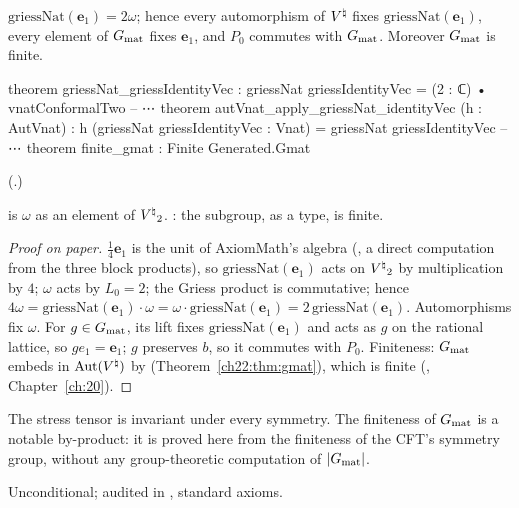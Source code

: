 \begin{theorem}\label{ch22:thm:omega}
$\mathrm{griessNat}(\mathbf{e}_1)=2\omega$; hence every automorphism of ${V^{\natural}}$ fixes $\mathrm{griessNat}(\mathbf{e}_1)$, every element of
$G_{\mathrm{mat}}$ fixes $\mathbf{e}_1$, and $P_0$ commutes with $G_{\mathrm{mat}}$.  Moreover $G_{\mathrm{mat}}$ is finite.
\end{theorem}
\begin{leancode}
theorem griessNat_griessIdentityVec :
    griessNat griessIdentityVec = (2 : ℂ) • vnatConformalTwo
-- ⋯
theorem autVnat_apply_griessNat_identityVec (h : AutVnat) :
    h (griessNat griessIdentityVec : Vnat) = griessNat griessIdentityVec
-- ⋯
theorem finite_gmat : Finite Generated.Gmat
\end{leancode}
(.)
\begin{dictionary}
 is $\omega$ as an element of ${V^{\natural}}_2$.  : the subgroup, as a type, is
finite.
\end{dictionary}
\begin{proof}[Proof on paper]
$\frac14\mathbf{e}_1$ is the unit of AxiomMath's algebra (, a direct computation from the three block products),
so $\mathrm{griessNat}(\mathbf{e}_1)$ acts on ${V^{\natural}}_2$ by multiplication by $4$; $\omega$ acts by $L_0=2$; the Griess product is
commutative; hence $4\omega=\mathrm{griessNat}(\mathbf{e}_1)\cdot\omega=\omega\cdot\mathrm{griessNat}(\mathbf{e}_1)=2\,\mathrm{griessNat}(\mathbf{e}_1)$.
Automorphisms fix $\omega$.  For $g\in G_{\mathrm{mat}}$, its lift fixes $\mathrm{griessNat}(\mathbf{e}_1)$ and acts as $g$ on the
rational lattice, so $ge_1=\mathbf{e}_1$; $g$ preserves $b$, so it commutes with $P_0$.  Finiteness: $G_{\mathrm{mat}}$ embeds in
$\operatorname{Aut}({V^{\natural}})$ by  (Theorem~\ref{ch22:thm:gmat}), which is finite (, Chapter~\ref{ch:20}).
\end{proof}
\begin{physics}
The stress tensor is invariant under every symmetry.  The finiteness of $G_{\mathrm{mat}}$ is a notable by-product: it is proved
here from the finiteness of the CFT's symmetry group, without any group-theoretic computation of $|G_{\mathrm{mat}}|$.
\end{physics}
\begin{status}Unconditional; audited in , standard axioms.\end{status}

